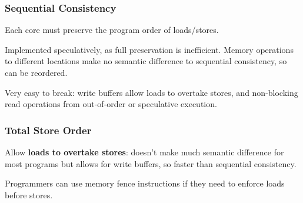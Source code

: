\documentclass[11pt]{article}
\begin{document}
{{        \subsubsection*{Sequential Consistency}
        {
            Each core must preserve the program order of loads/stores.

            Implemented speculatively, as full preservation is inefficient. Memory operations to different locations make no semantic difference to sequential consistency, so can be reordered.

            Very easy to break: write buffers allow loads to overtake stores, and non-blocking read operations from out-of-order or speculative execution.
        }
        \subsubsection*{Total Store Order}
        {
            Allow \textbf{loads to overtake stores}: doesn't make much semantic difference for most programs but allows for write buffers, so faster than sequential consistency.

            Programmers can use memory fence instructions if they need to enforce loads before stores.
        }
    }
}
\end{document}

